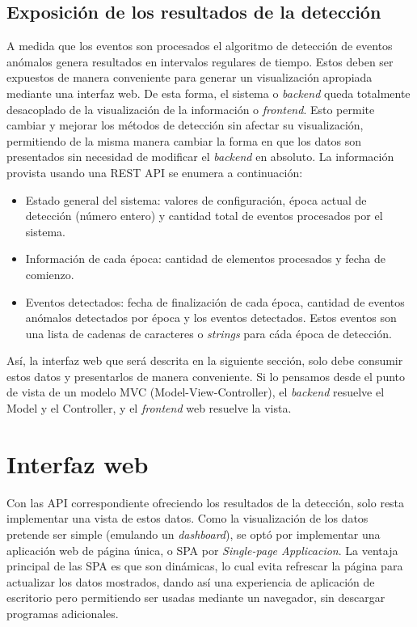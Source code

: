 \documentclass[a4paper,10pt, oneside]{article}
\begin{document}
\subsection{Exposición de los resultados de la detección}
A medida que los eventos son procesados el algoritmo de detección de eventos anómalos genera resultados en intervalos regulares de tiempo. Estos deben ser expuestos de manera conveniente para generar un visualización apropiada mediante una interfaz web. De esta forma, el sistema o \textit{backend} queda totalmente desacoplado de la visualización de la información o \textit{frontend}. Esto permite cambiar y mejorar los métodos de detección sin afectar su visualización, permitiendo de la misma manera cambiar la forma en que los datos son presentados sin necesidad de modificar el \textit{backend} en absoluto.
La información provista usando una REST API se enumera a continuación:
\begin{itemize}
	\item Estado general del sistema: valores de configuración, época actual de detección (número entero) y cantidad total de eventos procesados por el sistema.
	\item Información de cada época:  cantidad de elementos procesados y fecha de comienzo.
	\item Eventos detectados: fecha de finalización de cada época, cantidad de eventos anómalos detectados por época y los eventos detectados. Estos eventos son una lista de cadenas de caracteres o \textit{strings} para cáda época de detección.
\end{itemize}

Así, la interfaz web que será descrita en la siguiente sección, solo debe consumir estos datos y presentarlos de manera conveniente. Si lo pensamos desde el punto de vista de un modelo MVC (Model-View-Controller), el \textit{backend} resuelve el Model y el Controller, y el \textit{frontend} web resuelve la vista.

\section{Interfaz web}
Con las API correspondiente ofreciendo los resultados de la detección, solo resta implementar una vista de estos datos. Como la visualización de los datos pretende ser simple (emulando un \textit{dashboard}), se optó por implementar una aplicación web de página única, o SPA por \textit{Single-page Applicacion}. La ventaja principal de las SPA es que son dinámicas, lo cual evita refrescar la página para actualizar los datos mostrados, dando así una experiencia de aplicación de escritorio pero permitiendo ser usadas mediante un navegador, sin descargar programas adicionales.
\end{document}
